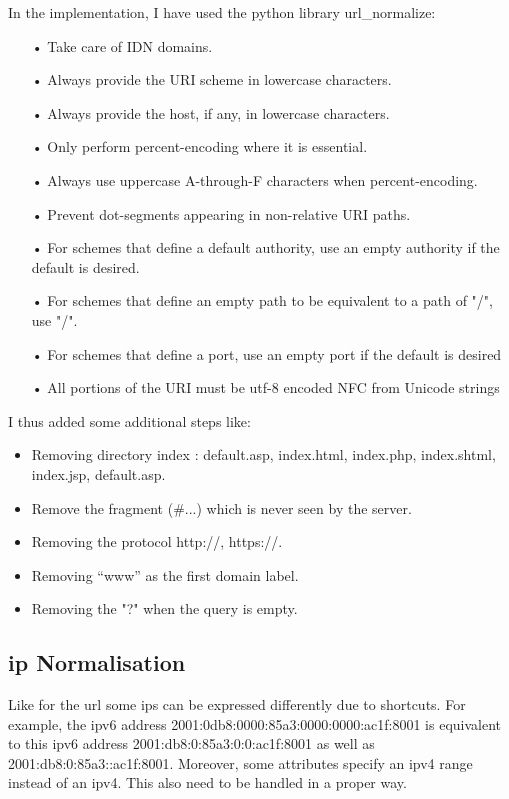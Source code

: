 \documentclass{eplmastersthesis}
\begin{document}
In the implementation, I have used the python library url\_normalize:
\begin{itemize}
\item[•] Take care of IDN domains.
\item[•] Always provide the URI scheme in lowercase characters.
\item[•] Always provide the host, if any, in lowercase characters.
\item[•] Only perform percent-encoding where it is essential.
\item[•] Always use uppercase A-through-F characters when percent-encoding.
\item[•] Prevent dot-segments appearing in non-relative URI paths.
\item[•] For schemes that define a default authority, use an empty authority if the default is desired.
\item[•] For schemes that define an empty path to be equivalent to a path of "/", use "/".
\item[•] For schemes that define a port, use an empty port if the default is desired
\item[•] All portions of the URI must be utf-8 encoded NFC from Unicode strings
\end{itemize}

I thus added some additional steps like:
\begin{itemize}
\item Removing directory index : {default.asp, index.html, index.php, index.shtml, index.jsp, default.asp}.
\item Remove the fragment (\#...) which is never seen by the server.
\item Removing the protocol {http://, https://}.
\item Removing  “www” as the first domain label.
\item Removing the "?" when the query is empty.
\end{itemize}

\subsection{\gls{ip} Normalisation}
\label{sec:IPNorm}
Like for the \gls{url} some \gls{ip}s can be expressed differently due to shortcuts. For example, the \gls{ipv6} address 2001:0db8:0000:85a3:0000:0000:ac1f:8001 is equivalent to this \gls{ipv6} address 2001:db8:0:85a3:0:0:ac1f:8001 as well as 2001:db8:0:85a3::ac1f:8001.
Moreover, some attributes specify an \gls{ipv4} range instead of an \gls{ipv4}. This also need to be handled in a proper way.\\
\end{document}
